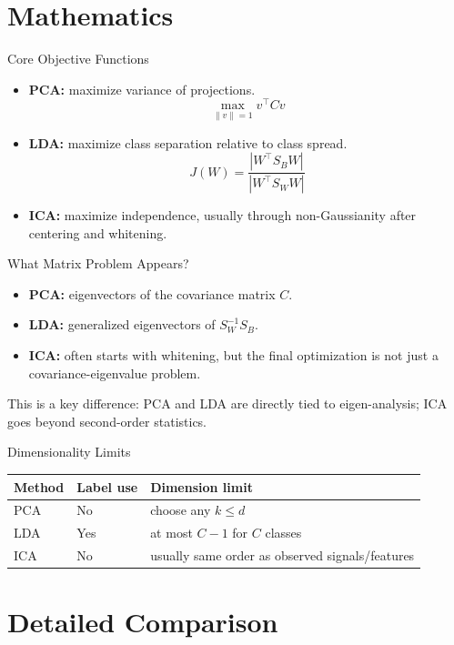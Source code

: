 \documentclass[aspectratio=169]{beamer}
\begin{document}
\section{Mathematics}

\begin{frame}{Core Objective Functions}
  \begin{itemize}[<+->]
    \item \textbf{PCA:} maximize variance of projections.
    \[
      \max_{\|v\|=1} v^\top C v
    \]
    \item \textbf{LDA:} maximize class separation relative to class spread.
    \[
      J(W) = \frac{|W^\top S_B W|}{|W^\top S_W W|}
    \]
    \item \textbf{ICA:} maximize independence, usually through non-Gaussianity after centering and whitening.
  \end{itemize}
\end{frame}

\begin{frame}{What Matrix Problem Appears?}
  \begin{itemize}[<+->]
    \item \textbf{PCA:} eigenvectors of the covariance matrix $C$.
    \item \textbf{LDA:} generalized eigenvectors of $S_W^{-1} S_B$.
    \item \textbf{ICA:} often starts with whitening, but the final optimization is not just a covariance-eigenvalue problem.
  \end{itemize}
  \vspace{0.3em}
  \small This is a key difference: PCA and LDA are directly tied to eigen-analysis; ICA goes beyond second-order statistics.
\end{frame}

\begin{frame}{Dimensionality Limits}
  \centering
  \begin{tabular}{lll}
    \toprule
    \textbf{Method} & \textbf{Label use} & \textbf{Dimension limit} \\
    \midrule
    PCA & No & choose any $k \le d$ \\
    LDA & Yes & at most $C-1$ for $C$ classes \\
    ICA & No & usually same order as observed signals/features \\
    \bottomrule
  \end{tabular}
\end{frame}

\section{Detailed Comparison}
\end{document}
